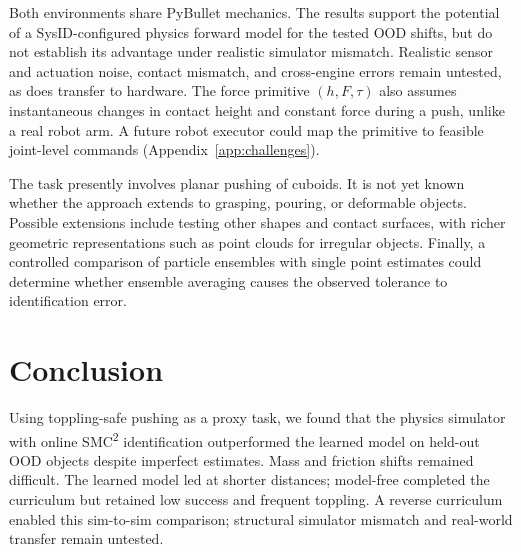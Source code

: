 \documentclass[12pt]{article}
\begin{document}
Both environments share PyBullet mechanics. The results support the potential of a SysID-configured physics forward model for the tested OOD shifts, but do not establish its advantage under realistic simulator mismatch. Realistic sensor and actuation noise, contact mismatch, and cross-engine errors remain untested, as does transfer to hardware. The force primitive $(h,F,\tau)$ also assumes instantaneous changes in contact height and constant force during a push, unlike a real robot arm. A future robot executor could map the primitive to feasible joint-level commands (Appendix~\ref{app:challenges}).

The task presently involves planar pushing of cuboids. It is not yet known whether the approach extends to grasping, pouring, or deformable objects. Possible extensions include testing other shapes and contact surfaces, with richer geometric representations such as point clouds for irregular objects. Finally, a controlled comparison of particle ensembles with single point estimates could determine whether ensemble averaging causes the observed tolerance to identification error.

\section{Conclusion}\label{sec:conclusion}
Using toppling-safe pushing as a proxy task, we found that the physics simulator with online SMC\textsuperscript{2} identification outperformed the learned model on held-out OOD objects despite imperfect estimates. Mass and friction shifts remained difficult. The learned model led at shorter distances; model-free completed the curriculum but retained low success and frequent toppling. A reverse curriculum enabled this sim-to-sim comparison; structural simulator mismatch and real-world transfer remain untested.
\end{document}
